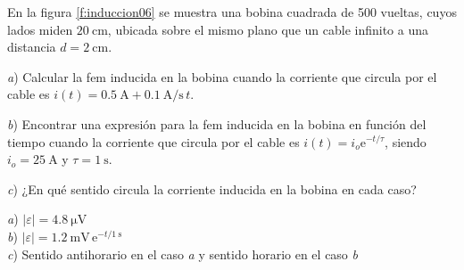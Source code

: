 %
\begin{Exercise}\label{p:induccion06}
    En la figura \ref{f:induccion06} se muestra una bobina cuadrada de 500 vueltas, cuyos lados miden $\SI{20}{\centi\metre}$, ubicada sobre el mismo plano que un cable infinito a una distancia $d = \SI{2}{\centi\metre}$.\par
    \textit{a}) Calcular la fem inducida en la bobina cuando la corriente que circula por el cable es $i(t) = \SI{0.5}{\ampere} + \SI{0.1}{\ampere/\second}\,t$.\par
    \textit{b}) Encontrar una expresión para la fem inducida en la bobina en función del tiempo cuando la corriente que circula por el cable es $i(t) = i_o \text{e}^{-t/\tau}$, siendo $i_o = \SI{25}{\ampere}$ y $\tau = \SI{1}{\second}$.\par
    \textit{c}) ¿En qué sentido circula la corriente inducida en la bobina en cada caso?
\end{Exercise}
\begin{Answer}
    \begin{minipage}[t]{.4\textwidth}
        \textit{a}) $|\varepsilon| = \SI{4.8}{\micro\volt}$\\ \textit{b}) $|\varepsilon| = \SI{1.2}{\milli\volt}\,\text{e}^{-t/\SI{1}{\second}}$\\ \textit{c}) Sentido antihorario en el caso \textit{a} y sentido horario en el caso \textit{b}
    \end{minipage}
\end{Answer}
%
\begin{center}
\end{center}
%
